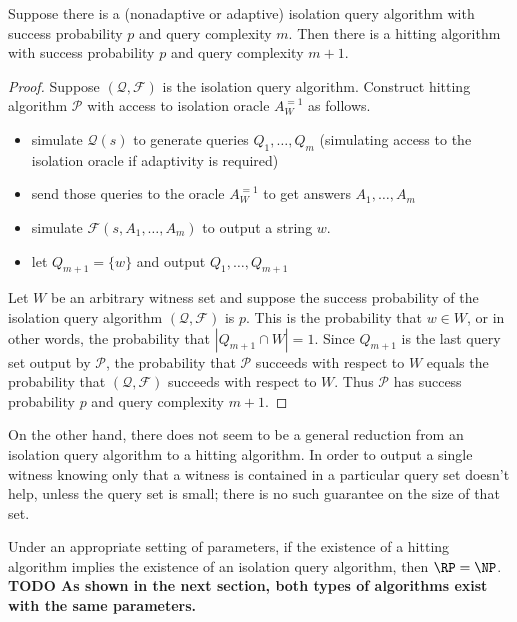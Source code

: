 \documentclass{article}
\newcommand{\todo}[1]{\textbf{TODO #1}}
\newcommand{\mc}{\mathcal}
\begin{document}
\begin{lemma}\label{lem:reduction}
  Suppose there is a (nonadaptive or adaptive) isolation query algorithm with success probability $p$ and query complexity $m$.
  Then there is a hitting algorithm with success probability $p$ and query complexity $m + 1$.
\end{lemma}
\begin{proof}
  Suppose $(\mc{Q}, \mc{F})$ is the isolation query algorithm.
  Construct hitting algorithm $\mc{P}$ with access to isolation oracle $A^{=1}_W$ as follows.
  \begin{itemize}
  \item simulate $\mc{Q}(s)$ to generate queries $Q_1, \dotsc, Q_m$ (simulating access to the isolation oracle if adaptivity is required)
  \item send those queries to the oracle $A^{=1}_W$ to get answers $A_1, \dotsc, A_m$
  \item simulate $\mc{F}(s, A_1, \dotsc, A_m)$ to output a string $w$.
  \item let $Q_{m + 1} = \{ w \}$ and output $Q_1, \dotsc, Q_{m + 1}$
  \end{itemize}

  Let $W$ be an arbitrary witness set and suppose the success probability of the isolation query algorithm $(\mc{Q}, \mc{F})$ is $p$.
  This is the probability that $w \in W$, or in other words, the probability that $|Q_{m + 1} \cap W| = 1$.
  Since $Q_{m + 1}$ is the last query set output by $\mc{P}$, the probability that $\mc{P}$ succeeds with respect to $W$ equals the probability that $(\mc{Q}, \mc{F})$ succeeds with respect to $W$.
  Thus $\mc{P}$ has success probability $p$ and query complexity $m + 1$.
\end{proof}

On the other hand, there does not seem to be a general reduction from an isolation query algorithm to a hitting algorithm.
In order to output a single witness knowing only that a witness is contained in a particular query set doesn't help, unless the query set is small; there is no such guarantee on the size of that set.

\begin{conjecture}
  Under an appropriate setting of parameters, if the existence of a hitting algorithm implies the existence of an isolation query algorithm, then $\RP = \NP$.
  \todo{As shown in the next section, both types of algorithms exist with the same parameters.}
\end{conjecture}
\end{document}
